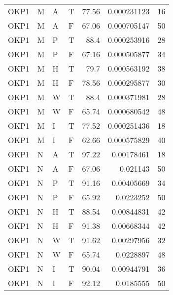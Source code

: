 \begin{tabular}{llllrrr}
    OKP1     & M     & A     & T          & 77.56      & 0.000231123 & 16       \\
    OKP1     & M     & A     & F          & 67.06      & 0.000705147 & 50       \\
    OKP1     & M     & P     & T          & 88.4       & 0.000253916 & 28       \\
    OKP1     & M     & P     & F          & 67.16      & 0.000505877 & 34       \\
    OKP1     & M     & H     & T          & 79.7       & 0.000563192 & 38       \\
    OKP1     & M     & H     & F          & 78.56      & 0.000295877 & 30       \\
    OKP1     & M     & W     & T          & 88.4       & 0.000371981 & 28       \\
    OKP1     & M     & W     & F          & 65.74      & 0.000680542 & 48       \\
    OKP1     & M     & I     & T          & 77.52      & 0.000251436 & 18       \\
    OKP1     & M     & I     & F          & 62.66      & 0.000575829 & 40       \\
    OKP1     & N     & A     & T          & 97.22      & 0.00178461  & 18       \\
    OKP1     & N     & A     & F          & 67.06      & 0.021143    & 50       \\
    OKP1     & N     & P     & T          & 91.16      & 0.00405669  & 34       \\
    OKP1     & N     & P     & F          & 65.92      & 0.0223252   & 50       \\
    OKP1     & N     & H     & T          & 88.54      & 0.00844831  & 42       \\
    OKP1     & N     & H     & F          & 91.38      & 0.00668344  & 42       \\
    OKP1     & N     & W     & T          & 91.62      & 0.00297956  & 32       \\
    OKP1     & N     & W     & F          & 65.74      & 0.0228897   & 48       \\
    OKP1     & N     & I     & T          & 90.04      & 0.00944791  & 36       \\
    OKP1     & N     & I     & F          & 92.12      & 0.0185555   & 50       \\
    \hline
\end{tabular}